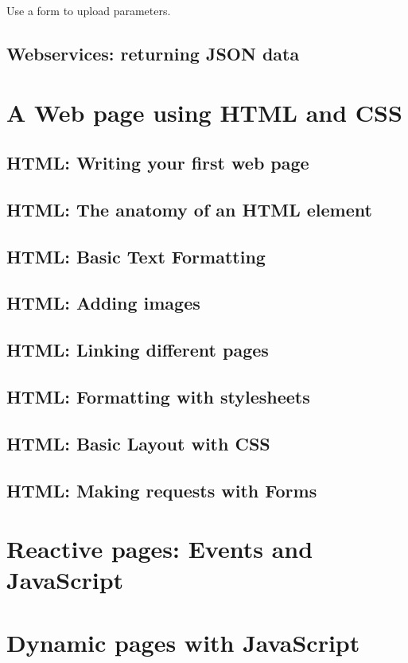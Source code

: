 \documentclass[12pt,a5paper]{memoir}
\begin{document}
Use a form to upload parameters.

\chapter{Webservices: returning JSON data}

\part{A Web page using HTML and CSS}

\chapter{HTML: Writing your first web page}

\chapter{HTML: The anatomy of an HTML element}

\chapter{HTML: Basic Text Formatting}

\chapter{HTML: Adding images}

\chapter{HTML: Linking different pages}

\chapter{HTML: Formatting with stylesheets}

\chapter{HTML: Basic Layout with CSS}

\chapter{HTML: Making requests with Forms}

\part{Reactive pages: Events and JavaScript}

\part{Dynamic pages with JavaScript}
\end{document}
